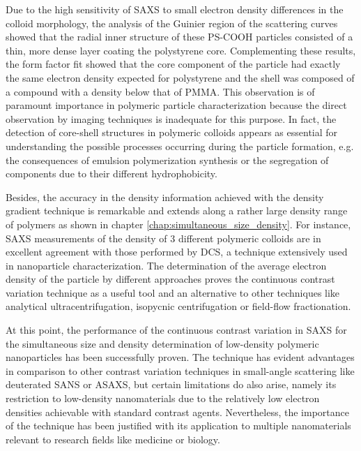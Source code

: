 Due to the high sensitivity of SAXS to small electron density differences in the colloid morphology, the analysis of the Guinier region of the scattering curves showed that the radial inner structure of these PS-COOH particles consisted of a thin, more dense layer coating the polystyrene core. Complementing these results, the form factor fit showed that the core component of the particle had exactly the same electron  density expected for polystyrene and the shell was composed of a compound with a density below that of PMMA. This observation is of paramount importance in polymeric particle characterization because the direct observation by imaging techniques is inadequate for this purpose. In fact, the detection of core-shell structures in polymeric colloids appears as essential for understanding the possible processes occurring during the particle formation, e.g. the consequences of emulsion polymerization synthesis or the segregation of components due to their different hydrophobicity.

Besides, the accuracy in the density information achieved with the density gradient technique is remarkable and extends along a rather large density range of polymers as shown in chapter \ref{chap:simultaneous_size_density}. For instance, SAXS measurements of the density of 3 different polymeric colloids are in excellent agreement with those performed by DCS, a technique extensively used in nanoparticle characterization. The determination of the average electron density of the particle by different approaches proves the continuous contrast variation technique as a useful tool and an alternative to other techniques like analytical ultracentrifugation, isopycnic centrifugation or field-flow fractionation.

At this point, the performance of the continuous contrast variation in SAXS for the simultaneous size and density determination of low-density polymeric nanoparticles has been successfully proven. The technique has evident advantages in comparison to other contrast variation techniques in small-angle scattering like deuterated SANS or ASAXS, but certain limitations do also arise, namely its restriction to low-density nanomaterials due to the relatively low electron densities achievable with standard contrast agents. Nevertheless, the importance of the technique has been justified with its application to multiple nanomaterials relevant to research fields like medicine or biology.

